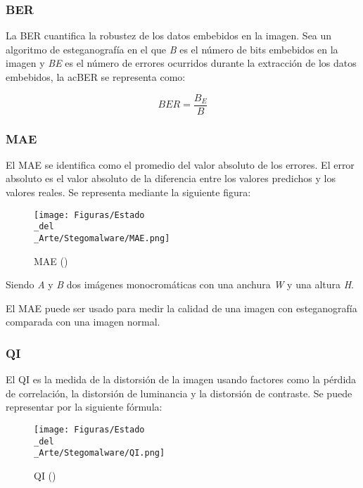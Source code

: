 \subsubsection{BER}

La \ac{BER} cuantifica la robustez de los datos embebidos en la imagen. Sea un algoritmo de esteganografía en el que \textit{B} es el número de bits embebidos en la imagen y \textit{BE} es el número de errores ocurridos durante la extracción de los datos embebidos, la ac{BER} se representa como:

\begin{equation}
BER = \frac{B_E}{B}
\end{equation}

\subsubsection{MAE}

El \ac{MAE} se identifica como el promedio del valor absoluto de los errores. El error absoluto es el valor absoluto de la diferencia entre los valores predichos y los valores reales. Se representa mediante la siguiente figura:

\begin{figure}[H]
  \centering
  \texttt{[image: Figuras/Estado\\\_del\\\_Arte/Stegomalware/MAE.png]}
  \label{fig:MAE}
  \caption{MAE (\cite{stegomalware})}
\end{figure}

Siendo \textit{A} y \textit{B} dos imágenes monocromáticas con una anchura \textit{W} y una altura \textit{H}.

El \ac{MAE} puede ser usado para medir la calidad de una imagen con esteganografía comparada con una imagen normal.

\subsubsection{QI}

El \ac{QI} es la medida de la distorsión de la imagen usando factores como la pérdida de correlación, la distorsión de luminancia y la distorsión de contraste. Se puede representar por la siguiente fórmula:

\begin{figure}[H]
  \centering
  \texttt{[image: Figuras/Estado\\\_del\\\_Arte/Stegomalware/QI.png]}
  \label{fig:QI}
  \caption{QI (\cite{stegomalware})}
\end{figure}


